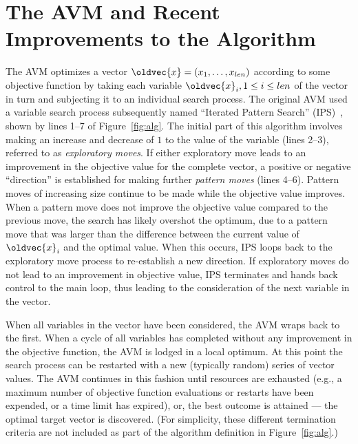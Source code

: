 \documentclass{llncs}
\let\vec\oldvec %
\newcommand{\inlineheading}[1]{\vspace{1mm} \noindent {\bf #1.}}
\begin{document}
\section{The AVM and Recent Improvements to the Algorithm}
\vspace{-1em}
\inlineheading{The Original AVM} The AVM optimizes a vector $\vec{x} = (x_1, \dots, x_{len})$ according to some objective function by taking each variable $\vec{x}_i, 1 \leq i \leq len$ of the vector in turn and subjecting it to an individual search process. The original AVM used a variable search process subsequently named
``Iterated Pattern Search'' (IPS)~\cite{Kempka2013,Kempka2015}, shown by lines 1--7 of Figure~\ref{fig:alg}. The initial part of
this algorithm involves making an increase and decrease of $1$ to the value of the variable (lines 2--3), referred to as
{\it exploratory moves}. If either exploratory move leads to an improvement in the objective value for the complete
vector, a positive or negative ``direction'' is established for making further {\it pattern moves\/} (lines 4--6). Pattern
moves of increasing size continue to be made while the objective value improves. When a pattern move does not improve
the objective value compared to the previous move, the search has likely overshot the optimum, due to a pattern move
that was larger than the difference between the current value of $\vec{x}_i$ and the optimal value. When this occurs,
IPS loops back to the exploratory move process to re-establish a new direction. If exploratory moves do not lead to an
improvement in objective value, IPS terminates and hands back control to the main loop, thus leading to the consideration of the next variable in the vector.

When all variables in the vector have been considered, the AVM wraps back to the first. When a cycle of all variables has completed without any improvement in the objective function, the AVM is lodged in a local optimum. At this point the search process can be restarted with a new (typically random) series of vector values. The AVM continues in this fashion until resources are exhausted (e.g., a maximum number of objective function evaluations or restarts have been expended, or a time limit has expired), or, the best outcome is attained --- the optimal target vector is discovered. (For simplicity, these different termination criteria are not included as part of the algorithm definition in Figure~\ref{fig:alg}.)
\end{document}
